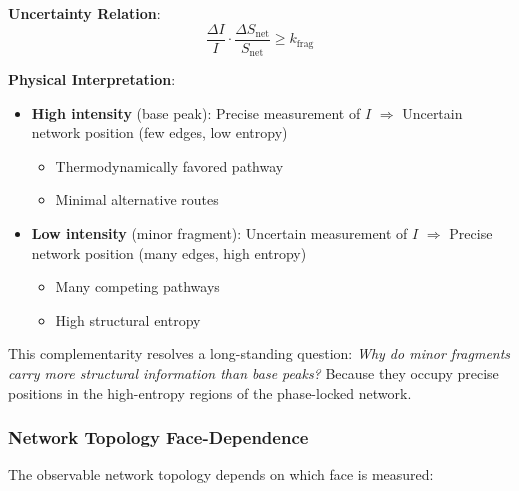\documentclass[twocolumn,10pt,a4paper]{article}
\theoremstyle{definition}
\theoremstyle{remark}
\begin{document}
\textbf{Uncertainty Relation}:
\begin{equation}
\frac{\Delta I}{I} \cdot \frac{\Delta S_{\text{net}}}{S_{\text{net}}} \geq k_{\text{frag}}
\end{equation}

\textbf{Physical Interpretation}:
\begin{itemize}
\item \textbf{High intensity} (base peak): Precise measurement of $I$ $\Rightarrow$ Uncertain network position (few edges, low entropy)
  \begin{itemize}
  \item Thermodynamically favored pathway
  \item Minimal alternative routes
  \end{itemize}

\item \textbf{Low intensity} (minor fragment): Uncertain measurement of $I$ $\Rightarrow$ Precise network position (many edges, high entropy)
  \begin{itemize}
  \item Many competing pathways
  \item High structural entropy
  \end{itemize}
\end{itemize}

This complementarity resolves a long-standing question: \emph{Why do minor fragments carry more structural information than base peaks?} Because they occupy precise positions in the high-entropy regions of the phase-locked network.

\subsubsection{Network Topology Face-Dependence}

The observable network topology depends on which face is measured:
\end{document}
